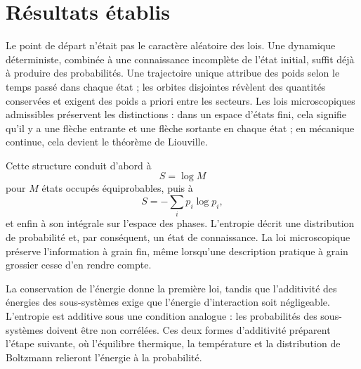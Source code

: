 \begin{classroomqa}
\end{classroomqa}

\section{Résultats établis}

Le point de départ n’était pas le caractère aléatoire des lois. Une dynamique déterministe, combinée à une connaissance incomplète de l’état initial, suffit déjà à produire des probabilités. Une trajectoire unique attribue des poids selon le temps passé dans chaque état ; les orbites disjointes révèlent des quantités conservées et exigent des poids a priori entre les secteurs. Les lois microscopiques admissibles préservent les distinctions : dans un espace d’états fini, cela signifie qu’il y a une flèche entrante et une flèche sortante en chaque état ; en mécanique continue, cela devient le théorème de Liouville.

Cette structure conduit d’abord à
\begin{equation}
 S=\log M
\end{equation}
pour \(M\) états occupés équiprobables, puis à
\begin{equation}
 S=-\sum_i p_i\log p_i,
\end{equation}
et enfin à son intégrale sur l’espace des phases. L’entropie décrit une distribution de probabilité et, par conséquent, un état de connaissance. La loi microscopique préserve l’information à grain fin, même lorsqu’une description pratique à grain grossier cesse d’en rendre compte.

La conservation de l’énergie donne la première loi, tandis que l’additivité des énergies des sous-systèmes exige que l’énergie d’interaction soit négligeable. L’entropie est additive sous une condition analogue : les probabilités des sous-systèmes doivent être non corrélées. Ces deux formes d’additivité préparent l’étape suivante, où l’équilibre thermique, la température et la distribution de Boltzmann relieront l’énergie à la probabilité.